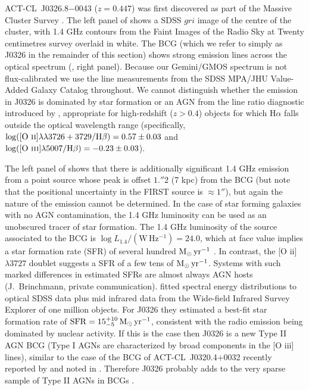 ACT-CL~J0326.8$-$0043 ($z=0.447$) was first discovered as part of the Massive Cluster Survey 
\citep[MACS~J0326.8$-$0043,][]{ebeling01}. The left panel of  shows a SDSS $gri$ 
image of the centre of the cluster, with 1.4 GHz contours from the Faint Images of the Radio Sky 
at Twenty centimetres \citep[FIRST,][]{becker95} survey overlaid in white. The BCG (which we refer 
to simply as J0326 in the remainder of this section) shows strong emission lines across the 
optical spectrum (, right panel). Because our Gemini/GMOS spectrum is not 
flux-calibrated we use the line measurements from the SDSS MPA/JHU Value-Added Galaxy Catalog 
\citep{brinchmann04} throughout. We cannot distinguish whether the emission in J0326 is 
dominated by star formation or an AGN from the line ratio diagnostic introduced by 
\cite{lamareille10}, appropriate for high-redshift ($z>0.4$) objects for which H$\alpha$ falls 
outside the optical wavelength range (specifically, $\log({\rm [\textrm{O {\sc 
ii}}]}\lambda\lambda3726+3729/{\rm H}\beta)=0.57\pm0.03$ and $\log({\rm [\textrm{O {\sc 
iii}}]}\lambda5007/{\rm H}\beta)=-0.23\pm0.03$).

The left panel of  shows that there is additionally significant 1.4 GHz emission 
from a point source whose peak is offset $1.\!''2$ (7 kpc) from the BCG (but note that the 
positional uncertainty in the FIRST source is $\approx1''$), but again the nature of the 
emission cannot be determined. In the case of star forming galaxies with no AGN contamination, the 
1.4 GHz luminosity can be used as an unobscured tracer of star formation. The 1.4 GHz luminosity 
of the source associated to the BCG is $\log L_{1.4}/(\mathrm{W\,Hz^{-1}})=24.0$, which at face 
value implies a star formation rate (SFR) of several hundred ${\rm M}_\odot\,\mathrm{yr^{-1}}$ 
\citep{hopkins03}. In contrast, the [O {\sc ii}]$\lambda3727$ doublet suggests a SFR of a few tens 
of ${\rm M}_\odot\,\mathrm{yr^{-1}}$. Systems with such marked differences in estimated SFRs are almost 
always AGN hosts (J.\ Brinchmann, private communication). \cite{chang15} fitted spectral energy 
distributions to optical SDSS data plus mid infrared data from the Wide-field Infrared Survey 
Explorer \citep[WISE,][]{wright10} of one million objects. For J0326 they estimated a best-fit star 
formation rate of ${\rm SFR}=15_{-5}^{+10}\,{\rm M}_\odot\,\mathrm{yr^{-1}}$, consistent with the radio 
emission being dominated by nuclear activity. If this is the case then J0326 is a new Type II AGN 
BCG (Type I AGNs are characterized by broad components in the [O {\sc iii}] lines), similar to the 
case of the BCG of ACT-CL~J0320.4+0032 recently reported by \cite{kirk15} and noted in 
. Therefore J0326 probably adds to the very sparse sample of Type II AGNs in BCGs 
\citep[see references in][]{kirk15}.

